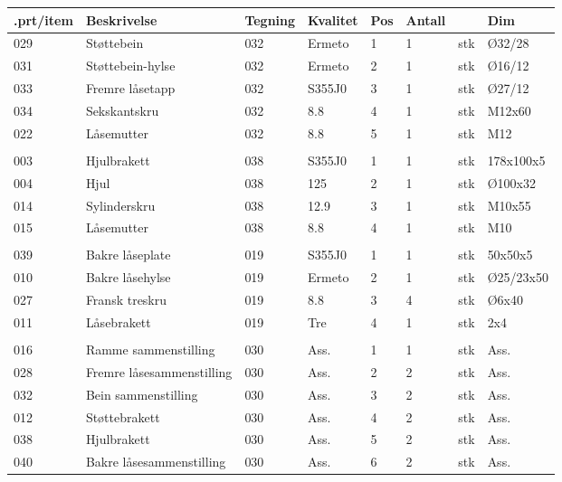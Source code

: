 \begin{tabular}{|l|l|l|l|l|l|l|l|}
\hline
.prt/item & Beskrivelse & Tegning & Kvalitet & Pos & Antall &  & Dim\\ \hline
029 & Støttebein & 032 & Ermeto & 1 & 1 & stk & Ø32/28\\ \hline
031 & Støttebein-hylse & 032 & Ermeto & 2 & 1 & stk & Ø16/12\\ \hline
033 & Fremre låsetapp & 032 & S355J0 & 3 & 1 & stk & Ø27/12\\ \hline
034 & Sekskantskru & 032 & 8.8 & 4 & 1 & stk & M12x60\\ \hline
022 & Låsemutter & 032 & 8.8 & 5 & 1 & stk & M12\\ \hline
 &  &  &  &  &  &  & \\ \hline
003 & Hjulbrakett & 038 & S355J0 & 1 & 1 & stk & 178x100x5\\ \hline
004 & Hjul & 038 & 125 & 2 & 1 & stk & Ø100x32\\ \hline
014 & Sylinderskru & 038 & 12.9 & 3 & 1 & stk & M10x55\\ \hline
015 & Låsemutter & 038 & 8.8 & 4 & 1 & stk & M10\\ \hline
 &  &  &  &  &  &  & \\ \hline
039 & Bakre låseplate & 019 & S355J0 & 1 & 1 & stk & 50x50x5\\ \hline
010 & Bakre låsehylse & 019 & Ermeto & 2 & 1 & stk & Ø25/23x50\\ \hline
027 & Fransk treskru & 019 & 8.8 & 3 & 4 & stk & Ø6x40\\ \hline
011 & Låsebrakett & 019 & Tre & 4 & 1 & stk & 2x4\\ \hline
 &  &  &  &  &  &  & \\ \hline
016 & Ramme sammenstilling & 030 & Ass. & 1 & 1 & stk & Ass.\\ \hline
028 & Fremre låsesammenstilling & 030 & Ass. & 2 & 2 & stk & Ass.\\ \hline
032 & Bein sammenstilling & 030 & Ass. & 3 & 2 & stk & Ass.\\ \hline
012 & Støttebrakett & 030 & Ass. & 4 & 2 & stk & Ass.\\ \hline
038 & Hjulbrakett & 030 & Ass. & 5 & 2 & stk & Ass.\\ \hline
040 & Bakre låsesammenstilling & 030 & Ass. & 6 & 2 & stk & Ass.\\ \hline
\end{tabular}
